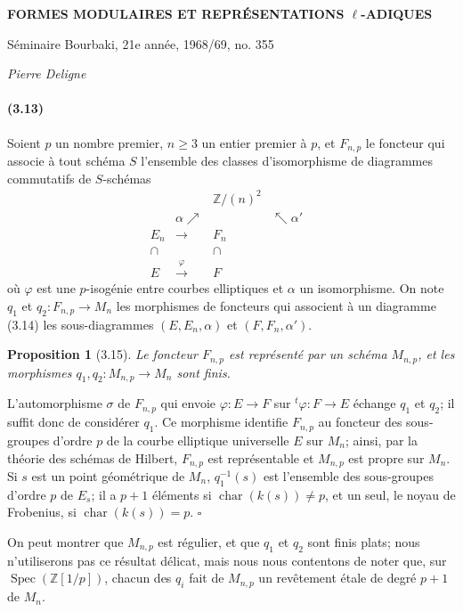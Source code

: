 \documentclass[10pt]{article}
\newcommand{\Z}{\mathbb Z}
\newcommand{\Spec}{\operatorname{Spec}}
\newcommand{\charop}{\operatorname{char}}
\newcommand{\QED}{\hfill$\square$}
\newtheorem*{proposition}{Proposition}
\begin{document}
\begin{center}
{\Large\bfseries FORMES MODULAIRES ET REPRÉSENTATIONS $\ell$-ADIQUES}\par
\vspace{0.35em}
{\large Séminaire Bourbaki, 21e année, 1968/69, no. 355}\par
\vspace{0.7em}
{\itshape Pierre Deligne}
\end{center}


\paragraph{(3.13)}
Soient $p$ un nombre premier, $n\geq 3$ un entier premier à $p$, et $F_{n,p}$ le foncteur qui associe à tout schéma $S$ l'ensemble des classes d'isomorphisme de diagrammes commutatifs de $S$-schémas
\[
\begin{array}{ccccc}
&& \Z/(n)^2 &&\\[-0.2em]
& \alpha\nearrow && \nwarrow\alpha' &\\[-0.2em]
E_n & \longrightarrow & F_n &&\\[-0.2em]
\cap && \cap &&\\[-0.2em]
E & \xrightarrow{\ \varphi\ } & F &&
\end{array}
\tag{3.14}
\]
où $\varphi$ est une $p$-isogénie entre courbes elliptiques et $\alpha$ un isomorphisme. On note $q_1$ et $q_2:F_{n,p}\to M_n$ les morphismes de foncteurs qui associent à un diagramme (3.14) les sous-diagrammes $(E,E_n,\alpha)$ et $(F,F_n,\alpha')$.

\begin{proposition}[3.15]
Le foncteur $F_{n,p}$ est représenté par un schéma $M_{n,p}$, et les morphismes $q_1,q_2:M_{n,p}\to M_n$ sont finis.
\end{proposition}

L'automorphisme $\sigma$ de $F_{n,p}$ qui envoie $\varphi:E\to F$ sur ${}^{t}\!\varphi:F\to E$ échange $q_1$ et $q_2$; il suffit donc de considérer $q_1$. Ce morphisme identifie $F_{n,p}$ au foncteur des sous-groupes d'ordre $p$ de la courbe elliptique universelle $E$ sur $M_n$; ainsi, par la théorie des schémas de Hilbert, $F_{n,p}$ est représentable et $M_{n,p}$ est propre sur $M_n$. Si $s$ est un point géométrique de $M_n$, $q_1^{-1}(s)$ est l'ensemble des sous-groupes d'ordre $p$ de $E_s$; il a $p+1$ éléments si $\charop(k(s))\ne p$, et un seul, le noyau de Frobenius, si $\charop(k(s))=p$. \QED

On peut montrer que $M_{n,p}$ est régulier, et que $q_1$ et $q_2$ sont finis plats; nous n'utiliserons pas ce résultat délicat, mais nous nous contentons de noter que, sur $\Spec(\Z[1/p])$, chacun des $q_i$ fait de $M_{n,p}$ un revêtement étale de degré $p+1$ de $M_n$.
\end{document}

